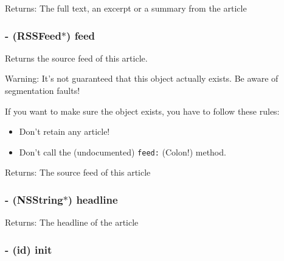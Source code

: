 \begin{Desc}
\item[Returns:]The full text, an excerpt or a summary from the article \end{Desc}
\subsubsection{\setlength{\rightskip}{0pt plus 5cm}- ({\bf RSSFeed}$\ast$) feed }\label{interfaceRSSArticle_bf64eba4838704987e6afa3d2e2c967f}


Returns the source feed of this article.

\begin{Desc}
\item[Warning:]It's not guaranteed that this object actually exists. Be aware of segmentation faults!\end{Desc}
If you want to make sure the object exists, you have to follow these rules:

\begin{itemize}
\item Don't retain any article! \item Don't call the (undocumented) {\tt feed:} (Colon!) method. \end{itemize}


\begin{Desc}
\item[Returns:]The source feed of this article \end{Desc}
\subsubsection{\setlength{\rightskip}{0pt plus 5cm}- (NSString$\ast$) headline }\label{interfaceRSSArticle_5c0896c6f2ae76e658dccd0a7e9d37db}


\begin{Desc}
\item[Returns:]The headline of the article \end{Desc}
\subsubsection{\setlength{\rightskip}{0pt plus 5cm}- (id) init }\label{interfaceRSSArticle_8223fd4f05616bcd99f7bbbbcb281896}


